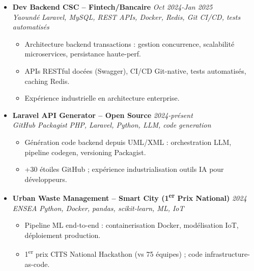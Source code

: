 \documentclass[a4paper,11pt]{article}
\begin{document}
\begin{itemize}[leftmargin=*, label=\tiny$\bullet$, nosep]
    \item \textbf{Dev Backend CSC -- Fintech/Bancaire} \hfill \textit{Oct 2024-Jan 2025} \\
    \textit{Yaound\'e} \hfill \textit{Laravel, MySQL, REST APIs, Docker, Redis, Git CI/CD, tests automatis\'es}
    \vspace{-2pt}
    \begin{itemize}[leftmargin=0.4cm, nosep, label=\tiny$\bullet$]
        \item \small{Architecture backend transactions : gestion concurrence, scalabilit\'e microservices, persistance haute-perf.}
        \item \small{APIs RESTful doc\'ees (Swagger), CI/CD Git-native, tests automatis\'es, caching Redis.}
        \item \small{Exp\'erience industrielle en architecture enterprise.}
    \end{itemize}
    \vspace{3pt}

    \item \textbf{Laravel API Generator -- Open Source} \hfill \textit{2024-pr\'esent} \\
    \textit{GitHub Packagist} \hfill \textit{PHP, Laravel, Python, LLM, code generation}
    \vspace{-2pt}
    \begin{itemize}[leftmargin=0.4cm, nosep, label=\tiny$\bullet$]
        \item \small{G\'en\'eration code backend depuis UML/XML : orchestration LLM, pipeline codegen, versioning Packagist.}
        \item \small{+30 \'etoiles GitHub ; exp\'erience industrialisation outils IA pour d\'eveloppeurs.}
    \end{itemize}
    \vspace{3pt}

    \item \textbf{Urban Waste Management -- Smart City (1\textsuperscript{er} Prix National)} \hfill \textit{2024} \\
    \textit{ENSEA} \hfill \textit{Python, Docker, pandas, scikit-learn, ML, IoT}
    \vspace{-2pt}
    \begin{itemize}[leftmargin=0.4cm, nosep, label=\tiny$\bullet$]
        \item \small{Pipeline ML end-to-end : containerisation Docker, mod\'elisation IoT, d\'eploiement production.}
        \item \small{1\textsuperscript{er} prix CITS National Hackathon (vs 75 \'equipes) ; code infrastructure-as-code.}
    \end{itemize}
    \vspace{3pt}


\end{itemize}
\end{document}
